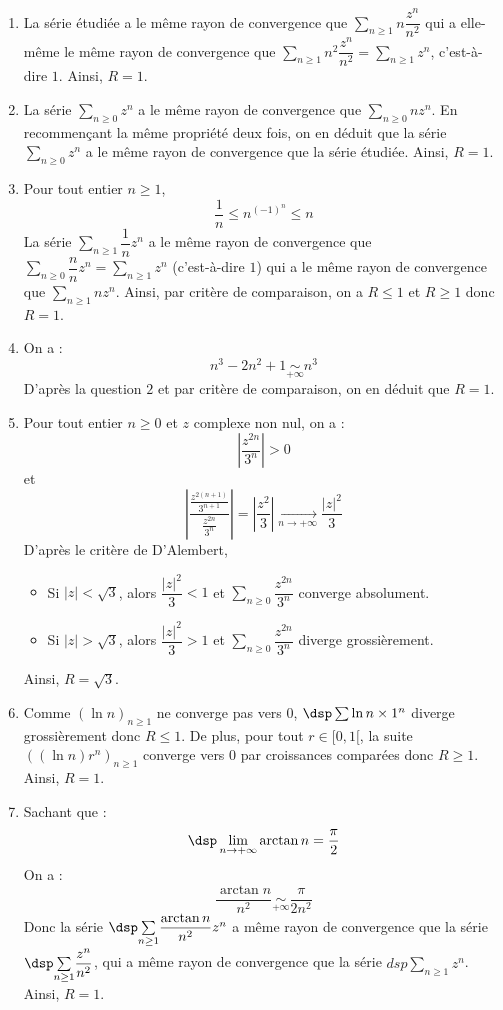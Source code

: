 \documentclass[a4paper,10pt]{report}
\newcommand{\Sum}[2]{\ensuremath{\textstyle{\sum\limits_{#1}^{#2}}}}
\begin{document}
\begin{enumerate}
\item La série étudiée a le même rayon de convergence que $\Sum{n \geq 1}{} n \dfrac{z^n}{n^2}$ qui a elle-même le même rayon de convergence que $\Sum{n \geq 1}{} n^2 \dfrac{z^n}{n^2} = \Sum{n \geq 1}{} z^n$, c'est-à-dire $1$. Ainsi, $R=1$.
\item La série $\Sum{n \geq 0}{} z^n$ a le même rayon de convergence que $\Sum{n \geq 0}{} n z^n$. En recommençant la même propriété deux fois, on en déduit que la série $\Sum{n \geq 0}{} z^n$ a le même rayon de convergence que la série étudiée. Ainsi, $R=1$.
\item Pour tout entier $n \geq 1$,
$$ \dfrac{1}{n} \leq n^{(-1)^n} \leq n$$
La série $\Sum{n \geq 1}{} \dfrac{1}{n} z^n$ a le même rayon de convergence que $\Sum{n \geq 0}{} \dfrac{n}{n} z^n = \Sum{n \geq 1}{}  z^n$ (c'est-à-dire $1$) qui a le même rayon de convergence que $\Sum{n \geq 1}{} n z^n$. Ainsi, par critère de comparaison, on a $R \leq 1$ et $R \geq 1$ donc $R=1$.
\item On a :
$$ n^3-2n^2+1 \underset{+ \infty}{\sim} n^3$$
D'après la question $2$ et par critère de comparaison, on en déduit que $R=1$.
\item Pour tout entier $n \geq 0$ et $z$ complexe non nul, on a :
$$ \left\vert \frac{z^{2n}}{3^n} \right\vert >0$$
et 
$$ \left\vert\dfrac{\frac{z^{2(n+1)}}{3^{n+1}}}{\frac{z^{2n}}{3^n}}\right\vert=\left\vert\dfrac{z^2}{3}\right\vert\underset{n\to +\infty}{\longrightarrow}\dfrac{\vert z\vert^2}{3}$$
D'après le critère de D'Alembert,
\begin{itemize}
\item Si $\vert z\vert<\sqrt{3}$, alors $\dfrac{\vert z\vert^2}{3}<1$ et $\Sum{n \geq 0}{}\dfrac{z^{2n}}{3^n}$ converge absolument. 
\item Si $\vert z\vert>\sqrt{3}$, alors $\dfrac{\vert z\vert^2}{3}>1$ et $\Sum{n \geq 0}{} \dfrac{z^{2n}}{3^n}$ diverge grossièrement. 
\end{itemize}
Ainsi, $R=\sqrt{3}$.
\item Comme $(\ln n)_{n\geq 1}$ ne converge pas vers $0$, $\dsp\sum \ln n \times 1^n$ diverge grossièrement donc $R\leq 1$. De plus, pour tout $r \in [0,1[$, la suite $((\ln n)r^n)_{n\geq 1}$ converge vers $0$ par croissances comparées donc $R\geq 1$. Ainsi, $R=1$.
\item Sachant que :
$$\dsp\lim_{n\to +\infty}\arctan n=\dfrac{\pi}{2}$$
On a :
\[
\dfrac{\arctan n}{n^2} \underset{ +\infty}{\sim}\dfrac{\pi}{2n^2}
\]
Donc la série $\dsp\Sum{n \geq 1}{} \dfrac{\arctan n}{n^2}z^n$ a même rayon de convergence que la série $\dsp\Sum{n \geq 1}{}  \dfrac{z^n}{n^2}$, qui a même rayon de convergence que la série $dsp\Sum{n \geq 1}{}  z^n$. Ainsi, $R=1$.

\end{enumerate}
\end{document}
